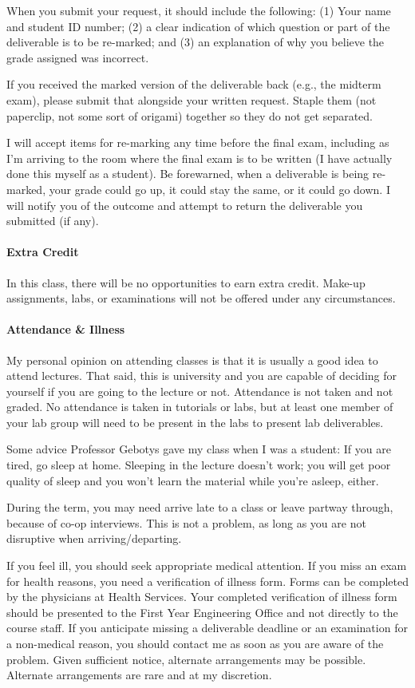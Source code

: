 \documentclass[letterpaper,10pt]{article}
\begin{document}
When you submit your request, it should include the following: (1) Your name and student ID number; (2) a clear indication of which question or part of the deliverable is to be re-marked; and (3) an explanation of why you believe the grade assigned was incorrect.

If you received the marked version of the deliverable back (e.g., the midterm exam), please submit that alongside your written request. Staple them (not paperclip, not some sort of origami) together so they do not get separated.

I will accept items for re-marking any time before the final exam, including as I'm arriving to the room where the final exam is to be written (I have actually done this myself as a student). Be forewarned, when a deliverable is being re-marked, your grade could go up, it could stay the same, or it could go down. I will notify you of the outcome and attempt to return the deliverable you submitted (if any).

\paragraph{Extra Credit}
In this class, there will be no opportunities to earn extra credit. Make-up assignments, labs, or examinations will not be offered under any circumstances.

\paragraph{Attendance \& Illness}

My personal opinion on attending classes is that it is usually a good idea to attend lectures. That said, this is university and you are capable of deciding for yourself if you are going to the lecture or not. Attendance is not taken and not graded. No attendance is taken in tutorials or labs, but at least one member of your lab group will need to be present in the labs to present lab deliverables.

Some advice Professor Gebotys gave my class when I was a student: If you are tired, go sleep at home. Sleeping in the lecture doesn't work; you will get poor quality of sleep and you won't learn the material while you're asleep, either.

During the term, you may need arrive late to a class or leave partway through, because of co-op interviews. This is not a problem, as long as you are not disruptive when arriving/departing.

If you feel ill, you should seek appropriate medical attention. If you miss an exam for health reasons, you need a verification of illness form. Forms can be completed by the physicians at Health Services. Your completed verification of illness form should be presented to the First Year Engineering Office and not directly to the course staff. If you anticipate missing a deliverable deadline or an examination for a non-medical reason, you should contact me as soon as you are aware of the problem. Given sufficient notice, alternate arrangements may be possible. Alternate arrangements are rare and at my discretion.
\end{document}
